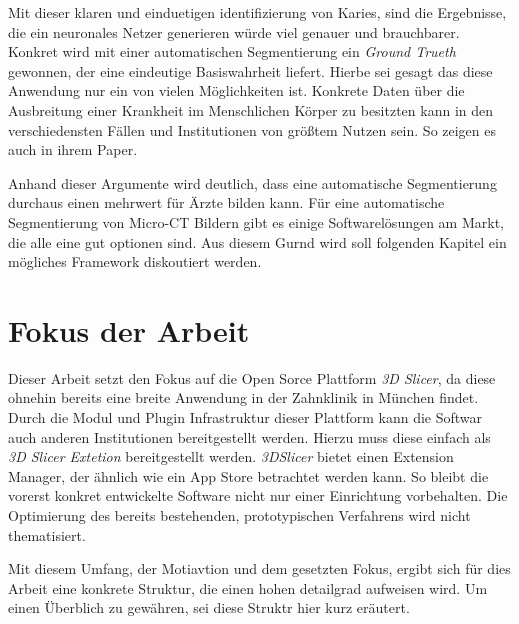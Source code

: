 Mit dieser klaren und einduetigen identifizierung von Karies, sind die
Ergebnisse, die ein neuronales Netzer generieren würde viel genauer und brauchbarer.
Konkret wird mit einer automatischen Segmentierung ein \textit{Ground Trueth} gewonnen,
der eine eindeutige Basiswahrheit liefert. Hierbe sei gesagt das diese Anwendung
nur ein von vielen Möglichkeiten ist. Konkrete Daten über die Ausbreitung einer
Krankheit im Menschlichen Körper zu besitzten kann in den verschiedensten Fällen
und Institutionen von größtem Nutzen sein. So zeigen es auch \citet{de20083d} in
ihrem Paper.

Anhand dieser Argumente wird deutlich, dass eine automatische Segmentierung durchaus
einen mehrwert für Ärzte bilden kann. Für eine automatische Segmentierung von
Micro-CT Bildern gibt es einige Softwarelösungen am Markt, die alle eine gut optionen
sind. Aus diesem Gurnd wird soll folgenden Kapitel ein mögliches Framework
diskoutiert werden.

\section{Fokus der Arbeit}
\label{sec:fokus_der-arbeit} Dieser Arbeit setzt den Fokus auf die Open Sorce
Plattform \textit{3D Slicer}, da diese ohnehin bereits eine breite Anwendung in
der Zahnklinik in München findet. Durch die Modul und Plugin Infrastruktur dieser
Plattform kann die Softwar auch anderen Institutionen bereitgestellt werden.
Hierzu muss diese einfach als \textit{3D Slicer Extetion} bereitgestellt werden.
\textit{3DSlicer} bietet einen Extension Manager, der ähnlich wie ein App Store
betrachtet werden kann. So bleibt die vorerst konkret entwickelte Software nicht
nur einer Einrichtung vorbehalten. Die Optimierung des bereits bestehenden, prototypischen
Verfahrens wird nicht thematisiert.

Mit diesem Umfang, der Motiavtion und dem gesetzten Fokus, ergibt sich für dies Arbeit
eine konkrete Struktur, die einen hohen detailgrad aufweisen wird. Um einen Überblich
zu gewähren, sei diese Struktr hier kurz eräutert.

